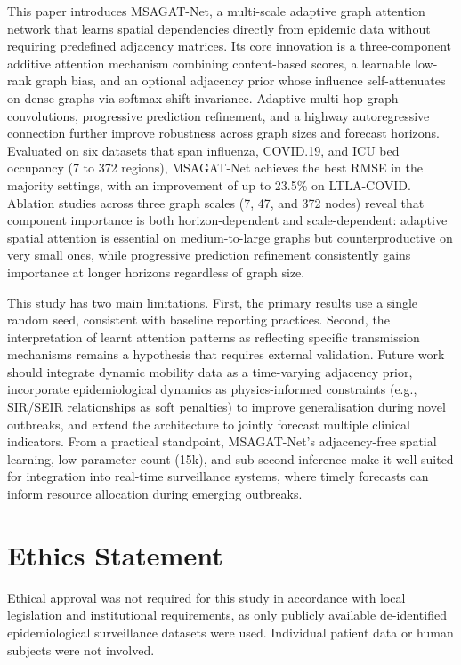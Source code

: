 \documentclass[final,1p,times]{elsarticle}
\begin{document}
This paper introduces MSAGAT-Net, a multi-scale adaptive graph attention network that learns spatial dependencies directly from epidemic data without requiring predefined adjacency matrices. Its core innovation is a three-component additive attention mechanism combining content-based scores, a learnable low-rank graph bias, and an optional adjacency prior whose influence self-attenuates on dense graphs via softmax shift-invariance. Adaptive multi-hop graph convolutions, progressive prediction refinement, and a highway autoregressive connection further improve robustness across graph sizes and forecast horizons. Evaluated on six datasets that span influenza, COVID.19, and ICU bed occupancy (7 to 372 regions), MSAGAT-Net achieves the best RMSE in the majority settings, with an improvement of up to 23.5\% on LTLA-COVID. Ablation studies across three graph scales (7, 47, and 372 nodes) reveal that component importance is both horizon-dependent and scale-dependent: adaptive spatial attention is essential on medium-to-large graphs but counterproductive on very small ones, while progressive prediction refinement consistently gains importance at longer horizons regardless of graph size.

This study has two main limitations. First, the primary results use a single random seed, consistent with baseline reporting practices. Second, the interpretation of learnt attention patterns as reflecting specific transmission mechanisms remains a hypothesis that requires external validation. Future work should integrate dynamic mobility data as a time-varying adjacency prior, incorporate epidemiological dynamics as physics-informed constraints (e.g., SIR/SEIR relationships as soft penalties) to improve generalisation during novel outbreaks, and extend the architecture to jointly forecast multiple clinical indicators. From a practical standpoint, MSAGAT-Net's adjacency-free spatial learning, low parameter count (15k), and sub-second inference make it well suited for integration into real-time surveillance systems, where timely forecasts can inform resource allocation during emerging outbreaks.

\section*{Ethics Statement}

Ethical approval was not required for this study in accordance with local legislation and institutional requirements, as only publicly available de-identified epidemiological surveillance datasets were used. Individual patient data or human subjects were not involved.
\end{document}

